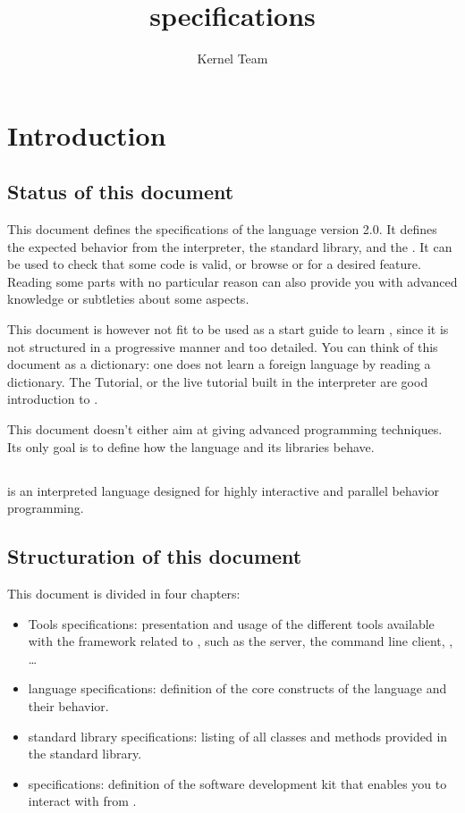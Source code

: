\documentclass[openright,twoside,12pt]{report}
\title{\us 2.0 specifications}
\author{Kernel Team}
\begin{document}
\maketitle
\tableofcontents

\chapter{Introduction}
\label{sec:intro}

\section{Status of this document}

This document defines the specifications of the \us language version
2.0. It defines the expected behavior from the \us interpreter, the
standard library, and the \sdk. It can be used to check that some code
is valid, or browse \us or \Cxx \api for a desired feature. Reading
some parts with no particular reason can also provide you with
advanced knowledge or subtleties about some \us aspects.

This document is however not fit to be used as a start guide to learn
\us, since it is not structured in a progressive manner and too
detailed. You can think of this document as a dictionary: one does not
learn a foreign language by reading a dictionary. The \us Tutorial, or
the live \us tutorial built in the interpreter are good introduction
to \us.

This document doesn't either aim at giving advanced programming
techniques. Its only goal is to define how the language and its
libraries behave.

\section{\us}

\us is an interpreted language designed for highly interactive and
parallel behavior programming. %

\section{Structuration of this document}

This document is divided in four chapters:

\begin{itemize}
\item Tools specifications: presentation and usage of the different
  tools available with the \urbi framework related to \us, such as the
  \urbi server, the command line client, \umake, \ldots
\item \us language specifications: definition of the core constructs
  of the language and their behavior.
\item \us standard library specifications: listing of all classes and
  methods provided in the standard library.
\item \urbi \sdk specifications: definition of the \urbi software
  development kit that enables you to interact with \urbi from \Cxx.
\end{itemize}
\end{document}

